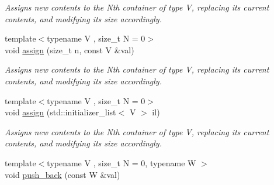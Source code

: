 \begin{DoxyCompactItemize}
\begin{DoxyCompactList}\small\item\em Assigns new contents to the Nth container of type V, replacing its current contents, and modifying its size accordingly. \end{DoxyCompactList}\item 
\hypertarget{classheterogeneous_1_1heterovector_3_01_t_00_01_u_00_01_types_8_8_8_4_abd15b36a95ee4b199fcae413fe38812f}{}{\footnotesize template$<$typename V , size\+\_\+t N = 0$>$ }\\void \hyperlink{classheterogeneous_1_1heterovector_3_01_t_00_01_u_00_01_types_8_8_8_4_abd15b36a95ee4b199fcae413fe38812f}{assign} (size\+\_\+t n, const V \&val)\label{classheterogeneous_1_1heterovector_3_01_t_00_01_u_00_01_types_8_8_8_4_abd15b36a95ee4b199fcae413fe38812f}

\begin{DoxyCompactList}\small\item\em Assigns new contents to the Nth container of type V, replacing its current contents, and modifying its size accordingly. \end{DoxyCompactList}\item 
\hypertarget{classheterogeneous_1_1heterovector_3_01_t_00_01_u_00_01_types_8_8_8_4_a7f0c04a02cf3f6485dcfcf1cd0af3b44}{}{\footnotesize template$<$typename V , size\+\_\+t N = 0$>$ }\\void \hyperlink{classheterogeneous_1_1heterovector_3_01_t_00_01_u_00_01_types_8_8_8_4_a7f0c04a02cf3f6485dcfcf1cd0af3b44}{assign} (std\+::initializer\+\_\+list$<$ V $>$ il)\label{classheterogeneous_1_1heterovector_3_01_t_00_01_u_00_01_types_8_8_8_4_a7f0c04a02cf3f6485dcfcf1cd0af3b44}

\begin{DoxyCompactList}\small\item\em Assigns new contents to the Nth container of type V, replacing its current contents, and modifying its size accordingly. \end{DoxyCompactList}\item 
\hypertarget{classheterogeneous_1_1heterovector_3_01_t_00_01_u_00_01_types_8_8_8_4_abd813200edadd7f63d96b7df5ac0d146}{}{\footnotesize template$<$typename V , size\+\_\+t N = 0, typename W $>$ }\\void \hyperlink{classheterogeneous_1_1heterovector_3_01_t_00_01_u_00_01_types_8_8_8_4_abd813200edadd7f63d96b7df5ac0d146}{push\+\_\+back} (const W \&val)\label{classheterogeneous_1_1heterovector_3_01_t_00_01_u_00_01_types_8_8_8_4_abd813200edadd7f63d96b7df5ac0d146}


\end{DoxyCompactItemize}
